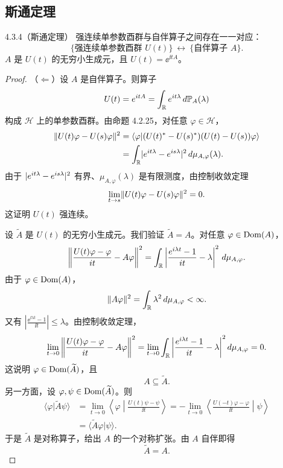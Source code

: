 \subsection{斯通定理}

\begin{theorem}{4.3.4}（斯通定理）
  强连续单参数酉群与自伴算子之间存在一一对应：
  \[
  \{\text{强连续单参数酉群 }U(t)\}\ \longleftrightarrow\ \{\text{自伴算子 }A\}.
  \]
  $A$ 是 $U(t)$ 的无穷小生成元，且 $U(t)=\ee^{\ii tA}$。
\end{theorem}

\begin{proof}
  （$\Leftarrow$）设 $A$ 是自伴算子。则算子
  \[
  U(t)=e^{i tA}=\int_{\mathbb{R}} e^{i t\lambda}\,d\mathbb{P}_A(\lambda)
  \]
  构成 $\mathcal{H}$ 上的单参数酉群。由命题 4.2.25，对任意 $\varphi\in\mathcal{H}$，
  \begin{align*}
  \lVert U(t)\varphi-U(s)\varphi\rVert^2
  &=\langle\varphi|(U(t)^*-U(s)^*)(U(t)-U(s))\varphi\rangle\\
  &=\int_{\mathbb{R}}\lvert e^{i t\lambda}-e^{i s\lambda}\rvert^2\,d\mu_{A,\varphi}(\lambda).
  \end{align*}
  由于 $\lvert e^{i t\lambda}-e^{i s\lambda}\rvert^2$ 有界、$\mu_{A,\varphi}(\lambda)$ 是有限测度，由控制收敛定理
  \[
  \lim_{t\to s}\lVert U(t)\varphi-U(s)\varphi\rVert^2=0.
  \]
  这证明 $U(t)$ 强连续。

  设 $\widetilde{A}$ 是 $U(t)$ 的无穷小生成元。我们验证 $\widetilde{A}=A$。对任意 $\varphi\in\operatorname{Dom}(A)$，
  \[
  \left\|\frac{U(t)\varphi-\varphi}{i t}-A\varphi\right\|^2
  =\int_{\mathbb{R}}\left|\frac{e^{i\lambda t}-1}{i t}-\lambda\right|^2\,d\mu_{A,\varphi}.
  \]
  由于 $\varphi\in\operatorname{Dom}(A)$，
  \[
  \lVert A\varphi\rVert^2=\int_{\mathbb{R}}\lambda^2\,d\mu_{A,\varphi}<\infty.
  \]
  又有 $\left|\frac{\ee^{\ii\lambda t}-1}{\ii t}\right|\le\lambda$。由控制收敛定理，
  \[
  \lim_{t\to 0}\left\|\frac{U(t)\varphi-\varphi}{i t}-A\varphi\right\|^2
  =\lim_{t\to 0}\int_{\mathbb{R}}\left|\frac{e^{i\lambda t}-1}{i t}-\lambda\right|^2d\mu_{A,\varphi}=0.
  \]
  这说明 $\varphi\in\operatorname{Dom}(\widetilde{A})$，且
  \[
  A\subseteq\widetilde{A}.
  \]
  另一方面，设 $\varphi,\psi\in\operatorname{Dom}(\widetilde{A})$。则
  \begin{align*}
  \langle\varphi|\widetilde{A}\psi\rangle
  &=\lim_{t\to 0}\left\langle\varphi\middle|\frac{U(t)\psi-\psi}{\ii t}\right\rangle
  =-\lim_{t\to 0}\left\langle\frac{U(-t)\varphi-\varphi}{\ii t}\middle|\psi\right\rangle\\
  &=\langle\widetilde{A}\varphi|\psi\rangle.
  \end{align*}
  于是 $\widetilde{A}$ 是对称算子，给出 $A$ 的一个对称扩张。由 $A$ 自伴即得
  \[
  \widetilde{A}=A.
  \]


\end{proof}
